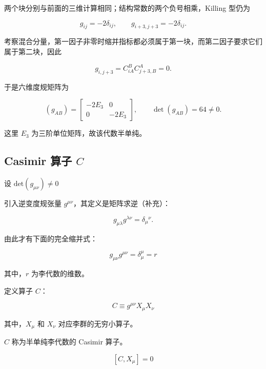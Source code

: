 两个块分别与前面的三维计算相同；结构常数的两个负号相乘，Killing 型仍为

\begin{equation}
g_{ij}=-2\delta_{ij},\qquad g_{i+3,j+3}=-2\delta_{ij}.
\end{equation}

考察混合分量，第一因子非零时缩并指标都必须属于第一块，而第二因子要求它们属于第二块，因此

\begin{equation}
g_{i,j+3}=C_{iA}^{B}C_{j+3,B}^{A}=0.
\end{equation}

于是六维度规矩阵为

\begin{equation}
\left(g_{AB}\right)=\begin{bmatrix}-2E_3&0\\0&-2E_3\end{bmatrix},\qquad \det\left(g_{AB}\right)=64\ne0.
\end{equation}

这里 $E_3$ 为三阶单位矩阵，故该代数半单纯。

\subsection{\texorpdfstring{Casimir 算子 $C$}{Casimir 算子 C}}

设 $\mathrm{det}\left(g_{\mu\nu} \right)\ne 0$

引入逆变度规张量 $g^{\mu\nu}$，其定义是矩阵求逆（补充）：

\begin{equation}
g_{\mu\lambda}g^{\lambda\nu}=\delta_\mu{}^\nu.
\end{equation}

由此才有下面的完全缩并式：

\begin{equation}
g_{\mu\nu} g^{\mu\nu} 
=\delta_\mu^\mu
=r
\end{equation}

其中，$r$ 为李代数的维数。

定义算子 $C$：

\begin{equation}
C
\equiv g^{\mu\nu} X_\mu X_\nu
\end{equation}

其中，$X_\mu$ 和 $X_\nu$ 对应李群的无穷小算子。

$C$ 称为半单纯李代数的 Casimir 算子。

\begin{equation}
\left[C,X_\mu \right]=0
\end{equation}

